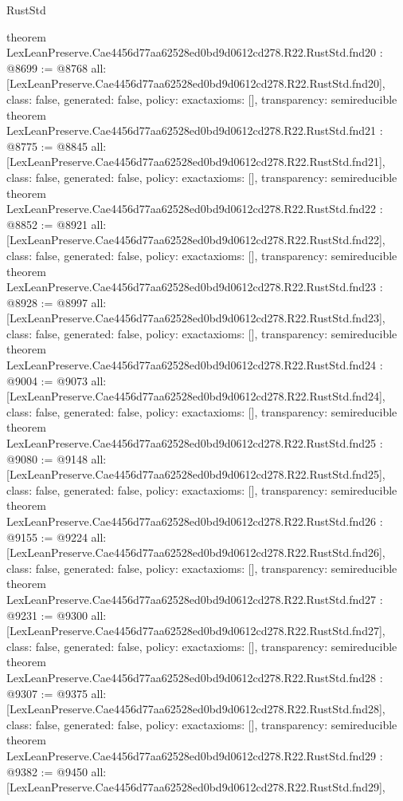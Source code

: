\begin{lexlean}{RustStd}
\begin{coremodule}
{}
theorem LexLeanPreserve.Cae4456d77aa62528ed0bd9d0612cd278.R22.RustStd.fnd20 : @8699 := @8768 {
  all: [LexLeanPreserve.Cae4456d77aa62528ed0bd9d0612cd278.R22.RustStd.fnd20],
  class: false,
  generated: false,
  policy: exact{axioms: []},
  transparency: semireducible
}
theorem LexLeanPreserve.Cae4456d77aa62528ed0bd9d0612cd278.R22.RustStd.fnd21 : @8775 := @8845 {
  all: [LexLeanPreserve.Cae4456d77aa62528ed0bd9d0612cd278.R22.RustStd.fnd21],
  class: false,
  generated: false,
  policy: exact{axioms: []},
  transparency: semireducible
}
theorem LexLeanPreserve.Cae4456d77aa62528ed0bd9d0612cd278.R22.RustStd.fnd22 : @8852 := @8921 {
  all: [LexLeanPreserve.Cae4456d77aa62528ed0bd9d0612cd278.R22.RustStd.fnd22],
  class: false,
  generated: false,
  policy: exact{axioms: []},
  transparency: semireducible
}
theorem LexLeanPreserve.Cae4456d77aa62528ed0bd9d0612cd278.R22.RustStd.fnd23 : @8928 := @8997 {
  all: [LexLeanPreserve.Cae4456d77aa62528ed0bd9d0612cd278.R22.RustStd.fnd23],
  class: false,
  generated: false,
  policy: exact{axioms: []},
  transparency: semireducible
}
theorem LexLeanPreserve.Cae4456d77aa62528ed0bd9d0612cd278.R22.RustStd.fnd24 : @9004 := @9073 {
  all: [LexLeanPreserve.Cae4456d77aa62528ed0bd9d0612cd278.R22.RustStd.fnd24],
  class: false,
  generated: false,
  policy: exact{axioms: []},
  transparency: semireducible
}
theorem LexLeanPreserve.Cae4456d77aa62528ed0bd9d0612cd278.R22.RustStd.fnd25 : @9080 := @9148 {
  all: [LexLeanPreserve.Cae4456d77aa62528ed0bd9d0612cd278.R22.RustStd.fnd25],
  class: false,
  generated: false,
  policy: exact{axioms: []},
  transparency: semireducible
}
theorem LexLeanPreserve.Cae4456d77aa62528ed0bd9d0612cd278.R22.RustStd.fnd26 : @9155 := @9224 {
  all: [LexLeanPreserve.Cae4456d77aa62528ed0bd9d0612cd278.R22.RustStd.fnd26],
  class: false,
  generated: false,
  policy: exact{axioms: []},
  transparency: semireducible
}
theorem LexLeanPreserve.Cae4456d77aa62528ed0bd9d0612cd278.R22.RustStd.fnd27 : @9231 := @9300 {
  all: [LexLeanPreserve.Cae4456d77aa62528ed0bd9d0612cd278.R22.RustStd.fnd27],
  class: false,
  generated: false,
  policy: exact{axioms: []},
  transparency: semireducible
}
theorem LexLeanPreserve.Cae4456d77aa62528ed0bd9d0612cd278.R22.RustStd.fnd28 : @9307 := @9375 {
  all: [LexLeanPreserve.Cae4456d77aa62528ed0bd9d0612cd278.R22.RustStd.fnd28],
  class: false,
  generated: false,
  policy: exact{axioms: []},
  transparency: semireducible
}
theorem LexLeanPreserve.Cae4456d77aa62528ed0bd9d0612cd278.R22.RustStd.fnd29 : @9382 := @9450 {
  all: [LexLeanPreserve.Cae4456d77aa62528ed0bd9d0612cd278.R22.RustStd.fnd29],
}
\end{coremodule}
\end{lexlean}
